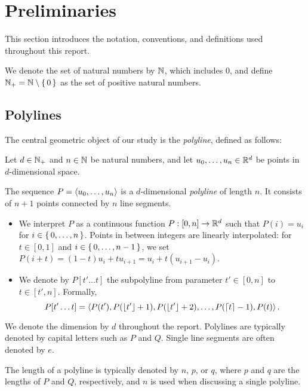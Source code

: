 \section{Preliminaries}
\label{sec:preliminaries}

This section introduces the notation, conventions, and definitions used throughout this report.

We denote the set of natural numbers by \(\mathbb{N}\), which includes \(0\), and define \(\mathbb{N}_+ = \mathbb{N} \setminus\set{0}\) as the set of positive natural numbers.

\subsection{Polylines}
\label{ssec:polylines}

The central geometric object of our study is the \emph{polyline}, defined as follows:

\begin{definition}[Polyline]
  Let \(d\in \mathbb{N}_+\) and \(n \in \mathbb{N}\) be natural numbers, and let \(u_0, \dots, u_n \in \mathbb{R}^d\) be points in \(d\)-dimensional space.

  The sequence \(P = \left\langle u_0, \dots, u_n\right\rangle\) is a \(d\)-dimensional \emph{polyline} of length \(n\). It consists of \(n+1\) points connected by \(n\) line segments.
  \begin{itemize}
    \item We interpret \(P\) as a continuous function \(P:[0,n] \to \mathbb{R}^d\) such that \(P(i) = u_i\) for \(i \in \set{0, \dots, n}\).
      Points in between integers are linearly interpolated: for \(t \in [0, 1]\) and \(i \in \set{0, \dots, n - 1}\), we set \(P(i + t) = (1- t)u_i + t u_{i+1} = u_i + t(u_{i+1} - u_i)\).
    \item We denote by \(P[t' \dots t]\) the subpolyline from parameter \(t' \in [0, n]\) to \(t \in [t', n]\). Formally,
			\[P[t' \dots t] = \left\langle P(t'), P(\left\lfloor t'\right\rfloor + 1),  P(\left\lfloor t'\right\rfloor + 2), \dots, P(\left\lceil t\right\rceil - 1), P(t)\right\rangle.\]
  \end{itemize}
\end{definition}

We denote the dimension by \(d\) throughout the report. Polylines are typically denoted by capital letters such as \(P\) and \(Q\). Single line segments are often denoted by \(e\).

The length of a polyline is typically denoted by \(n\), \(p\), or \(q\), where \(p\) and \(q\) are the lengths of \(P\) and \(Q\), respectively, and \(n\) is used when discussing a single polyline.

